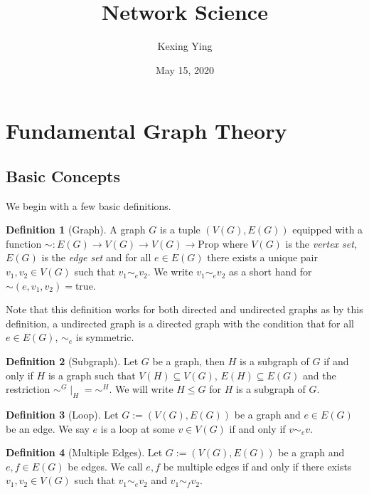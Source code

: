 \documentclass[
]{article}
\title{Network Science}
\author{Kexing Ying}
\date{May 15, 2020}
\theoremstyle{definition}
\newtheorem{definition}{Definition}[section]
\begin{document}
\maketitle

{
\hypersetup{linkcolor=}
\setcounter{tocdepth}{2}
\tableofcontents
}
\hypertarget{fundamental-graph-theory}{%
\section{Fundamental Graph Theory}\label{fundamental-graph-theory}}

\hypertarget{basic-concepts}{%
\subsection{Basic Concepts}\label{basic-concepts}}

We begin with a few basic definitions.

\begin{definition}[Graph]
  A graph \(G\) is a tuple \((V(G), E(G))\) equipped with a function 
  \(\sim : E(G) \to V(G) \to V(G) \to \text{Prop}\) where \(V(G)\) is the 
  \textit{vertex set}, \(E(G)\) is the \textit{edge set} and for all 
  \(e \in E(G)\) there exists a unique pair \(v_1, v_2 \in V(G)\) such that 
  \(v_1 \sim_e v_2\). We write \(v_1 \sim_e v_2\) as a short hand for 
  \(\sim(e, v_1, v_2) = \text{true}\).
\end{definition}

Note that this definition works for both directed and undirected graphs
as by this definition, a undirected graph is a directed graph with the
condition that for all \(e \in E(G)\), \(\sim_e\) is symmetric.

\begin{definition}[Subgraph]
  Let \(G\) be a graph, then \(H\) is a subgraph of \(G\) if and only if \(H\) 
  is a graph such that \(V(H) \subseteq V(G)\), \(E(H) \subseteq E(G)\) and the 
  restriction \(\sim^G\mid_H = \sim^H\). We will write \(H \le G\) for \(H\) is 
  a subgraph of \(G\).
\end{definition}

\begin{definition}[Loop]
  Let \(G := (V(G), E(G))\) be a graph and \(e \in E(G)\) be an edge. We say 
  \(e\) is a loop at some \(v \in V(G)\) if and only if \(v \sim_e v\).
\end{definition}

\begin{definition}[Multiple Edges] 
  Let \(G := (V(G), E(G))\) be a graph and \(e, f \in E(G)\) be edges. We call 
  \(e, f\) be multiple edges if and only if there exists \(v_1, v_2 \in V(G)\) 
  such that \(v_1 \sim_e v_2\) and \(v_1 \sim_f v_2\).
\end{definition}
\end{document}
